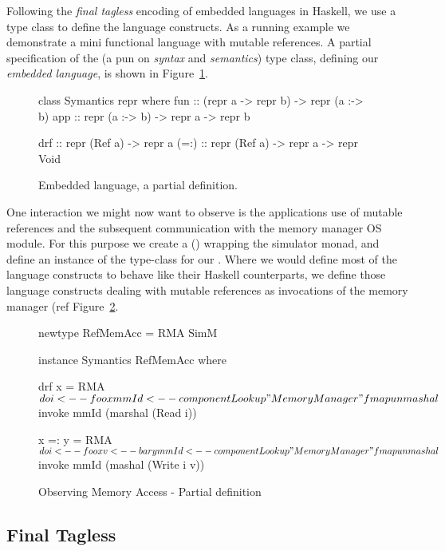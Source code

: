 Following the \emph{final tagless} \cite{final_tagless_embedding} encoding of embedded languages in Haskell, we use a type class to define the language constructs.
As a running example we demonstrate a mini functional language with mutable references.
A partial specification of the  (a pun on \emph{syntax} and \emph{semantics}) type class, defining our \emph{embedded language}, is shown in Figure~\ref{fig:embedded_language_interface}.

\begin{figure}
\centering
\begin{code}
class Symantics repr where
  fun   :: (repr a -> repr b) -> repr (a :-> b)
  app   :: repr (a :-> b) -> repr a -> repr b

  drf   :: repr (Ref a) -> repr a
  (=:)  :: repr (Ref a) -> repr a -> repr Void
\end{code}
\caption{Embedded language, a partial definition.}
\label{fig:embedded_language_interface}
\end{figure}

One interaction we might now want to observe is the applications use of mutable references and the subsequent communication with the memory manager OS module.
For this purpose we create a  () wrapping the simulator monad, and define an instance of the  type-class for our .
Where we would define most of the language constructs to behave like their Haskell counterparts, we define those language constructs dealing with mutable references as invocations of the memory manager (ref Figure~\ref{lst_observing_memory_access}.

\begin{figure}
\centering
\begin{code}
newtype RefMemAcc = RMA SimM

instance Symantics RefMemAcc where

  drf x = RMA $ do
    i     <-- foo x
    mmId  <-- componentLookup "MemoryManager"
    fmap unmashal $ invoke mmId (marshal (Read i))

  x =: y = RMA $ do
    i     <-- foo x
    v     <-- bar y
    mmId  <-- componentLookup "MemoryManager"
    fmap unmashal $ invoke mmId (mashal (Write i v))
\end{code}
\caption{Observing Memory Access - Partial definition}
\label{lst_observing_memory_access}
\end{figure}

\subsection{Final Tagless}

